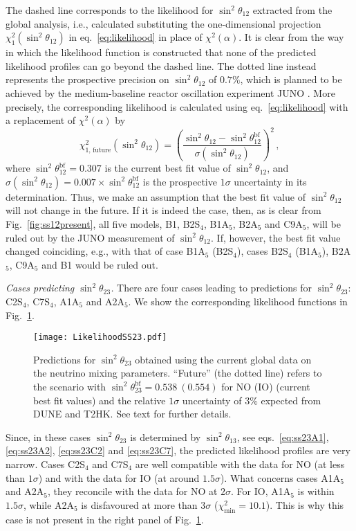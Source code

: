\documentclass[11pt,a4paper]{article}
\newcommand{\be}{\begin{equation}}
\newcommand{\ee}{\end{equation}}
\def\th{\theta}
\numberwithin{equation}{section}
\begin{document}
 The dashed line corresponds to the likelihood for $\sin^2\th_{12}$ 
extracted from the global analysis, i.e., calculated substituting 
the one-dimensional projection $\chi_1^2(\sin^2\th_{12})$ in eq.~\eqref{eq:likelihood}
in place of $\chi^2(\alpha)$. 
It is clear from the way in which the likelihood function is constructed 
that none of the predicted likelihood profiles can go beyond the dashed line. 
The dotted line instead represents 
the prospective precision on $\sin^2\th_{12}$ of $0.7\%$, 
which is planned to be achieved by 
the medium-baseline reactor oscillation experiment JUNO \cite{An:2015jdp}. 
More precisely, the corresponding likelihood is calculated using eq.~\eqref{eq:likelihood} 
with a replacement of $\chi^2(\alpha)$ by 
\be
\chi_\mathrm{1,\,future}^2\left(\sin^2\th_{12}\right) = \left(
\frac{\sin^2\th_{12} - \sin^2\th_{12}^\mathrm{bf}}{\sigma(\sin^2\th_{12})}
\right)^2\,,
\label{eq:chi2ss12future}
\ee
%
where $\sin^2\th_{12}^\mathrm{bf} = 0.307$ is the current best fit value of $\sin^2\th_{12}$, 
and $\sigma(\sin^2\th_{12}) = 0.007 \times \sin^2\th_{12}^\mathrm{bf}$ 
is the prospective $1\sigma$ uncertainty in its determination.
Thus, we make an assumption that the best fit value of $\sin^2\th_{12}$ 
will not change in the future. 
If it is indeed the case, then, as is clear from Fig.~\ref{fig:ss12present}, 
all five models, B1, B2S$_4$, B1A$_5$, B2A$_5$ and C9A$_5$, 
will be ruled out by the JUNO measurement of $\sin^2\th_{12}$. 
If, however, the best fit value changed coinciding, e.g., with that of case B1A$_5$ (B2S$_4$), 
cases B2S$_4$ (B1A$_5$), B2A$_5$, C9A$_5$ and B1 would be ruled out.

 \textit{Cases predicting $\sin^2\th_{23}$.} 
There are four cases leading to predictions for $\sin^2\th_{23}$: 
C2S$_4$, C7S$_4$, A1A$_5$ and A2A$_5$. 
We show the corresponding likelihood functions in Fig.~\ref{fig:ss23present}. 
\begin{figure}
\centering
\texttt{[image: LikelihoodSS23.pdf]}
\caption{Predictions for $\sin^2\th_{23}$ obtained using the current 
global data on the neutrino mixing parameters. 
``Future'' (the dotted line) refers to the scenario with 
$\sin^2\th_{23}^\mathrm{bf} = 0.538~(0.554)$ 
for NO (IO) (current best fit values) and the relative $1\sigma$ uncertainty of $3\%$ expected from DUNE and T2HK. See text for further details.}
\label{fig:ss23present}
\end{figure}
%
Since, in these cases $\sin^2\th_{23}$ is determined by $\sin^2\th_{13}$, see 
eqs.~\eqref{eq:ss23A1}, \eqref{eq:ss23A2}, \eqref{eq:ss23C2} and \eqref{eq:ss23C7}, 
the predicted likelihood profiles are very narrow. 
Cases C2S$_4$ and C7S$_4$ are well compatible with the data for NO 
(at less than $1\sigma$) and with the data for IO (at around $1.5\sigma$). 
What concerns cases A1A$_5$ and A2A$_5$, 
they reconcile with the data for NO at $2\sigma$. 
For IO, A1A$_5$ is within $1.5\sigma$, while A2A$_5$ is disfavoured at more than $3\sigma$ ($\chi^2_\mathrm{min} = 10.1$).
This is why this case is not present in the right panel of Fig.~\ref{fig:ss23present}.
\end{document}
